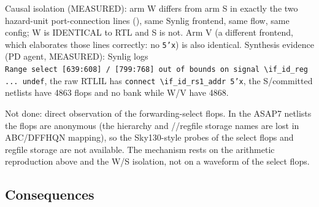 \begin{record}
Causal isolation (MEASURED): arm W differs from arm S in exactly the two
hazard-unit port-connection lines (), same
Synlig frontend, same flow, same config; W is IDENTICAL to RTL and S is
not. Arm V (a different frontend, which elaborates those lines
correctly: no \texttt{5'x}) is also identical. Synthesis evidence (PD
agent, MEASURED): Synlig logs
\texttt{Range\ select\ [639:\allowbreak{}608]\ /\allowbreak{}\ [799:\allowbreak{}768]\ out\ of\ bounds\ on\ signal\ \textbackslash{}if\_\allowbreak{}id\_\allowbreak{}reg\ .\allowbreak{}.\allowbreak{}.\allowbreak{}\ undef},
the raw RTLIL has
\texttt{connect\ \textbackslash{}if\_\allowbreak{}id\_\allowbreak{}rs1\_\allowbreak{}addr\ 5'x},
the S/\allowbreak{}committed netlists have 4863 flops and no
 bank while W/V have 4868.

Not done: direct observation of the forwarding-select flops. In the
ASAP7 netlists the flops are anonymous (the hierarchy and
//regfile storage names are lost in
ABC/\allowbreak{}DFFHQN mapping), so the Sky130-style probes of the
select flops and regfile storage are not available. The mechanism rests
on the arithmetic reproduction above and the W/S isolation, not on a
waveform of the select flops.

\end{record}

\subsection{Consequences}\label{cr:defect:asap7-cpu-synlig-ma7:consequences}

